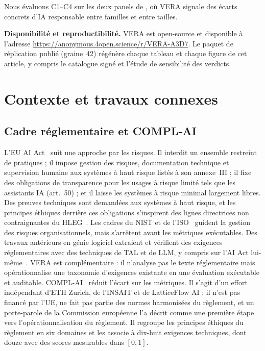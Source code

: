 \documentclass[10pt,conference]{IEEEtran}
\providecommand{\repourl}{https://anonymous.4open.science/r/VERA-A3D7}
\begin{document}
Nous évaluons C1--C4 sur les deux panels de , où VERA signale des écarts concrets d'IA responsable entre familles et entre tailles.

\smallskip\noindent\textbf{Disponibilité et reproductibilité.}
VERA est open-source et disponible à l'adresse \url{\repourl}. Le paquet de réplication publié (graine~42) régénère chaque tableau et chaque figure de cet article, y compris le catalogue signé et l'étude de sensibilité des verdicts.

\section{Contexte et travaux connexes}
\label{sec:related}

\subsection{Cadre réglementaire et COMPL-AI}
L'EU AI Act~\cite{euaiact2024} suit une approche par les risques.
Il interdit un ensemble restreint de pratiques ; il impose gestion des risques, documentation technique et supervision humaine aux systèmes à haut risque listés à son annexe~III ; il fixe des obligations de transparence pour les usages à risque limité tels que les assistants IA (art.~50) ; et il laisse les systèmes à risque minimal largement libres.
Des preuves techniques sont demandées aux systèmes à haut risque, et les principes éthiques derrière ces obligations s'inspirent des lignes directrices non contraignantes du HLEG~\cite{hleg2019trustworthyai}.
Les cadres du NIST et de l'ISO~\cite{nist2023airmf,iso42001_2023} guident la gestion des risques organisationnels, mais s'arrêtent avant les métriques exécutables.
Des travaux antérieurs en génie logiciel extraient et vérifient des exigences réglementaires avec des techniques de TAL et de LLM, y compris sur l'AI Act lui-même~\cite{abualhaija2025llmregextraction,amaral2022nlpcompliance,abualhaija2024regchange}.
VERA est complémentaire : il n'analyse pas le texte réglementaire mais opérationnalise une taxonomie d'exigences existante en une évaluation exécutable et auditable.
COMPL-AI~\cite{guldimann2024complai} réduit l'écart sur les métriques.
Il s'agit d'un effort indépendant d'ETH Zurich, de l'INSAIT et de LatticeFlow AI : il n'est pas financé par l'UE, ne fait pas partie des normes harmonisées du règlement, et un porte-parole de la Commission européenne l'a décrit comme une première étape vers l'opérationnalisation du règlement.
Il regroupe les principes éthiques du règlement en six domaines et les associe à dix-huit exigences techniques, dont douze avec des scores mesurables dans $[0,1]$.
\end{document}
